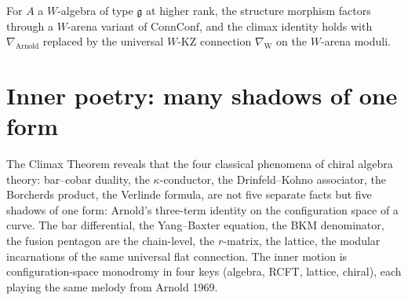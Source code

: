 \begin{conjecture}
\label{conj:climax-w-algebra-arena}
\ClaimStatusConjectured
For $A$ a $W$-algebra of type $\mathfrak{g}$ at higher rank, the
structure morphism factors through a $W$-arena variant of
$\mathrm{ConnConf}$, and the climax identity holds with
$\nabla_{\mathrm{Arnold}}$ replaced by the universal $W$-KZ connection
$\nabla_{\mathrm{W}}$ on the $W$-arena moduli.
\end{conjecture}

\section{Inner poetry: many shadows of one form}
\label{sec:climax-inner-poetry}

The Climax Theorem reveals that the four classical phenomena of
chiral algebra theory: bar--cobar duality, the $\kappa$-conductor,
the Drinfeld--Kohno associator, the Borcherds product, the Verlinde
formula, are not five separate facts but five shadows of one form:
Arnold's three-term identity on the configuration space of a curve.
The bar differential, the Yang--Baxter equation, the BKM denominator,
the fusion pentagon are the chain-level, the $r$-matrix, the lattice,
the modular incarnations of the same universal flat connection. The
inner motion is configuration-space monodromy in four keys (algebra,
RCFT, lattice, chiral), each playing the same melody from
Arnold 1969.
